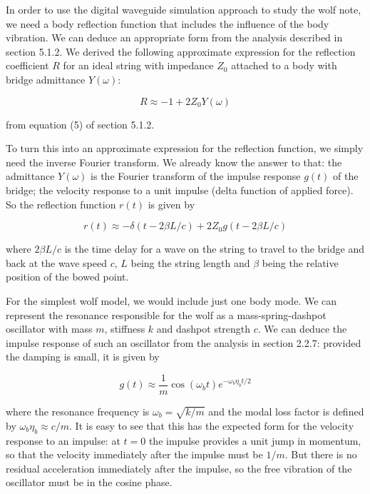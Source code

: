   In order to use the digital waveguide simulation approach to study the wolf 
  note, we need a body reflection function that includes the influence of the 
  body vibration. We can deduce an appropriate form from the analysis described 
  in section 5.1.2. We derived the following approximate expression for the 
  reflection coefficient $R$ for an ideal string with impedance $Z_0$ attached 
  to a body with bridge admittance $Y(\omega)$: 

  \begin{equation*}R \approx -1 + 2 Z_0 Y(\omega) \tag{1}\end{equation*} 

  \noindent{}from equation (5) of section 5.1.2. 

  To turn this into an approximate expression for the reflection function, we 
  simply need the inverse Fourier transform. We already know the answer to 
  that: the admittance $Y(\omega)$ is the Fourier transform of the impulse 
  response $g(t)$ of the bridge; the velocity response to a unit impulse (delta 
  function of applied force). So the reflection function $r(t)$ is given by 

  \begin{equation*}r(t) \approx -\delta(t-2\beta L /c) + 2Z_0 g(t-2\beta L /c) 
  \tag{2}\end{equation*} 

  \noindent{}where $2\beta L/c$ is the time delay for a wave on the string to 
  travel to the bridge and back at the wave speed $c$, $L$ being the string 
  length and $\beta$ being the relative position of the bowed point. 

  For the simplest wolf model, we would include just one body mode. We can 
  represent the resonance responsible for the wolf as a mass-spring-dashpot 
  oscillator with mass $m$, stiffness $k$ and dashpot strength $c$. We can 
  deduce the impulse response of such an oscillator from the analysis in 
  section 2.2.7: provided the damping is small, it is given by 

  \begin{equation*}g(t) \approx \dfrac{1}{m} \cos (\omega_b t) e^{-\omega_b 
  \eta_b t/2} \tag{3}\end{equation*} 

  \noindent{}where the resonance frequency is $\omega_b = \sqrt{k/m}$ and the 
  modal loss factor is defined by $\omega_b \eta_b \approx c/m$. It is easy to 
  see that this has the expected form for the velocity response to an impulse: 
  at $t=0$ the impulse provides a unit jump in momentum, so that the velocity 
  immediately after the impulse must be $1/m$. But there is no residual 
  acceleration immediately after the impulse, so the free vibration of the 
  oscillator must be in the cosine phase. 

